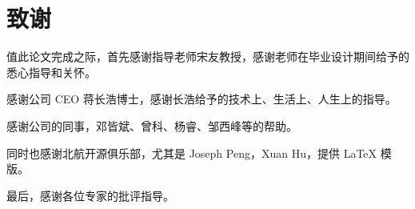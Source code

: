 \chapter*{致谢}
值此论文完成之际，首先感谢指导老师宋友教授，感谢老师在毕业设计期间给予的悉心指导和关怀。

感谢公司 CEO 蒋长浩博士，感谢长浩给予的技术上、生活上、人生上的指导。

感谢公司的同事，邓皆斌、曾科、杨睿、邹西峰等的帮助。

同时也感谢北航开源俱乐部，尤其是 Joseph Peng，Xuan Hu，提供 \LaTeX{} 模版。

最后，感谢各位专家的批评指导。
\cleardoublepage
